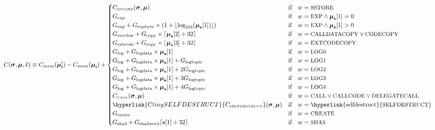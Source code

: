 \documentclass[9pt,oneside]{amsart}
\begin{document}
\begin{equation}
C(\boldsymbol{\sigma}, \boldsymbol{\mu}, I) \equiv C_{mem}(\boldsymbol{\mu}'_\mathbf{i})-C_{mem}(\boldsymbol{\mu}_\mathbf{i}) + \begin{cases}
C_\text{\tiny SSTORE}(\boldsymbol{\sigma}, \boldsymbol{\mu}) & \text{if} \quad w = \text{\small SSTORE} \\
G_{\mathrm{exp}} & \text{if} \quad w = \text{\small EXP} \wedge \boldsymbol{\mu}_\mathbf{s}[1] = 0 \\
G_{\mathrm{exp}} + G_{\mathrm{expbyte}}\times(1+\lfloor\log_{256}(\boldsymbol{\mu}_\mathbf{s}[1])\rfloor) & \text{if} \quad w = \text{\small EXP} \wedge \boldsymbol{\mu}_\mathbf{s}[1] > 0 \\
G_{\mathrm{verylow}} + G_{\mathrm{copy}}\times\lceil\boldsymbol{\mu}_\mathbf{s}[2] \div 32\rceil & \text{if} \quad w = \text{\small CALLDATACOPY} \lor \text{\small CODECOPY} \\
G_{\mathrm{extcode}} + G_{\mathrm{copy}}\times\lceil\boldsymbol{\mu}_\mathbf{s}[3] \div 32\rceil & \text{if} \quad w = \text{\small EXTCODECOPY} \\
G_{\mathrm{log}}+G_{\mathrm{logdata}}\times\boldsymbol{\mu}_\mathbf{s}[1] & \text{if} \quad w = \text{\small LOG0} \\
G_{\mathrm{log}}+G_{\mathrm{logdata}}\times\boldsymbol{\mu}_\mathbf{s}[1]+G_{\mathrm{logtopic}} & \text{if} \quad w = \text{\small LOG1} \\
G_{\mathrm{log}}+G_{\mathrm{logdata}}\times\boldsymbol{\mu}_\mathbf{s}[1]+2G_{\mathrm{logtopic}} & \text{if} \quad w = \text{\small LOG2} \\
G_{\mathrm{log}}+G_{\mathrm{logdata}}\times\boldsymbol{\mu}_\mathbf{s}[1]+3G_{\mathrm{logtopic}} & \text{if} \quad w = \text{\small LOG3} \\
G_{\mathrm{log}}+G_{\mathrm{logdata}}\times\boldsymbol{\mu}_\mathbf{s}[1]+4G_{\mathrm{logtopic}} & \text{if} \quad w = \text{\small LOG4} \\
C_\text{\tiny CALL}(\boldsymbol{\sigma}, \boldsymbol{\mu}) & \text{if} \quad w = \text{\small CALL} \lor \text{\small CALLCODE} \lor \text{\small DELEGATECALL} \\
\hyperlink{C tiny SELFDESTRUCT}{C_\text{\tiny SELFDESTRUCT}}(\boldsymbol{\sigma}, \boldsymbol{\mu}) & \text{if} \quad w = \text{\hyperlink{selfdestruct}{\small SELFDESTRUCT}} \\
G_{\mathrm{create}} & \text{if} \quad w = \text{\small CREATE}\\
G_{\mathrm{sha3}}+G_{\mathrm{sha3word}} \lceil \mathbf{s}[1] \div 32 \rceil & \text{if} \quad w = \text{\small SHA3}\\

\end{cases}
\end{equation}
\end{document}
